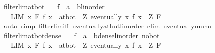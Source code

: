 \begin{isabellebody}
\endisatagproof
{\isafoldproof}%
%
\isadelimproof
\isanewline
%
\endisadelimproof
\isanewline
{}\isamarkupfalse%
\ filterlim{\isacharunderscore}{\kern0pt}at{\isacharunderscore}{\kern0pt}bot{\isacharcolon}{\kern0pt}\isanewline
\ \ \ f\ {\isacharcolon}{\kern0pt}{\isacharcolon}{\kern0pt}\ {\isachardoublequoteopen}{\isacharprime}{\kern0pt}a\ {\isasymRightarrow}\ {\isacharparenleft}{\kern0pt}{\isacharprime}{\kern0pt}b{\isacharcolon}{\kern0pt}{\isacharcolon}{\kern0pt}linorder{\isacharparenright}{\kern0pt}{\isachardoublequoteclose}\isanewline
\ \ \ {\isachardoublequoteopen}{\isacharparenleft}{\kern0pt}LIM\ x\ F{\isachardot}{\kern0pt}\ f\ x\ {\isacharcolon}{\kern0pt}{\isachargreater}{\kern0pt}\ at{\isacharunderscore}{\kern0pt}bot{\isacharparenright}{\kern0pt}\ {\isasymlongleftrightarrow}\ {\isacharparenleft}{\kern0pt}{\isasymforall}Z{\isachardot}{\kern0pt}\ eventually\ {\isacharparenleft}{\kern0pt}{\isasymlambda}x{\isachardot}{\kern0pt}\ f\ x\ {\isasymle}\ Z{\isacharparenright}{\kern0pt}\ F{\isacharparenright}{\kern0pt}{\isachardoublequoteclose}\isanewline
%
\isadelimproof
\ \ %
\endisadelimproof
%
\isatagproof
{}\isamarkupfalse%
\ {\isacharparenleft}{\kern0pt}auto\ simp{\isacharcolon}{\kern0pt}\ filterlim{\isacharunderscore}{\kern0pt}iff\ eventually{\isacharunderscore}{\kern0pt}at{\isacharunderscore}{\kern0pt}bot{\isacharunderscore}{\kern0pt}linorder\ elim{\isacharbang}{\kern0pt}{\isacharcolon}{\kern0pt}\ eventually{\isacharunderscore}{\kern0pt}mono{\isacharparenright}{\kern0pt}%
\endisatagproof
{\isafoldproof}%
%
\isadelimproof
\isanewline
%
\endisadelimproof
\isanewline
{}\isamarkupfalse%
\ filterlim{\isacharunderscore}{\kern0pt}at{\isacharunderscore}{\kern0pt}bot{\isacharunderscore}{\kern0pt}dense{\isacharcolon}{\kern0pt}\isanewline
\ \ \ f\ {\isacharcolon}{\kern0pt}{\isacharcolon}{\kern0pt}\ {\isachardoublequoteopen}{\isacharprime}{\kern0pt}a\ {\isasymRightarrow}\ {\isacharparenleft}{\kern0pt}{\isacharprime}{\kern0pt}b{\isacharcolon}{\kern0pt}{\isacharcolon}{\kern0pt}{\isacharbraceleft}{\kern0pt}dense{\isacharunderscore}{\kern0pt}linorder{\isacharcomma}{\kern0pt}\ no{\isacharunderscore}{\kern0pt}bot{\isacharbraceright}{\kern0pt}{\isacharparenright}{\kern0pt}{\isachardoublequoteclose}\isanewline
\ \ \ {\isachardoublequoteopen}{\isacharparenleft}{\kern0pt}LIM\ x\ F{\isachardot}{\kern0pt}\ f\ x\ {\isacharcolon}{\kern0pt}{\isachargreater}{\kern0pt}\ at{\isacharunderscore}{\kern0pt}bot{\isacharparenright}{\kern0pt}\ {\isasymlongleftrightarrow}\ {\isacharparenleft}{\kern0pt}{\isasymforall}Z{\isachardot}{\kern0pt}\ eventually\ {\isacharparenleft}{\kern0pt}{\isasymlambda}x{\isachardot}{\kern0pt}\ f\ x\ {\isacharless}{\kern0pt}\ Z{\isacharparenright}{\kern0pt}\ F{\isacharparenright}{\kern0pt}{\isachardoublequoteclose}\isanewline

\end{isabellebody}
